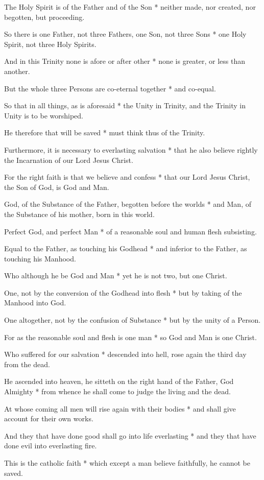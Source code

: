 The Holy Spirit is of the Father and of the Son * neither made, nor created, nor begotten, but proceeding.

So there is one Father, not three Fathers, one Son, not three Sons * one Holy Spirit, not three Holy Spirits.

And in this Trinity none is afore or after other * none is greater, or less than another.

But the whole three Persons are co-eternal together * and co-equal.

So that in all things, as is aforesaid * the Unity in Trinity, and the Trinity in Unity is to be worshiped.

He therefore that will be saved * must think thus of the Trinity.

Furthermore, it is necessary to everlasting salvation * that he also believe rightly the Incarnation of our Lord Jesus Christ.

For the right faith is that we believe and confess * that our Lord Jesus Christ, the Son of God, is God and Man.

God, of the Substance of the Father, begotten before the worlds * and Man, of the Substance of his mother, born in this world.

Perfect God, and perfect Man * of a reasonable soul and human flesh subsisting.

Equal to the Father, as touching his Godhead * and inferior to the Father, as touching his Manhood.

Who although he be God and Man * yet he is not two, but one Christ.

One, not by the conversion of the Godhead into flesh * but by taking of the Manhood into God.

One altogether, not by the confusion of Substance * but by the unity of a Person.

For as the reasonable soul and flesh is one man * so God and Man is one Christ.

Who suffered for our salvation * descended into hell, rose again the third day from the dead.

He ascended into heaven, he sitteth on the right hand of the Father, God Almighty * from whence he shall come to judge the living and the dead.

At whose coming all men will rise again with their bodies * and shall give account for their own works.

And they that have done good shall go into life everlasting * and they that have done evil into everlasting fire.

This is the catholic faith * which except a man believe faithfully, he cannot be saved.